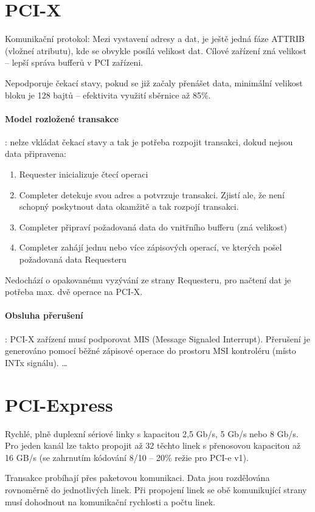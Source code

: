 \documentclass[a4paper, 11pt]{report}
\begin{document}
\section{PCI-X}
Komunikační protokol: Mezi vystavení adresy a dat, je ještě jedná fáze ATTRIB (vložneí atributu), kde se obvykle posílá velikost dat. Cílové zařízení zná velikost -- lepší správa bufferů v PCI zařízeni. 

Nepodporuje čekací stavy, pokud se již začaly přenášet data, minimální velikost bloku je 128 bajtů -- efektivita využití sběrnice až 85\%.

\paragraph{Model rozložené transakce}: nelze vkládat čekací stavy a tak je potřeba rozpojit transakci, dokud nejsou data připravena:
\begin{enumerate}
	\item Requester inicializuje čtecí operaci
	\item Completer detekuje svou adres a potvrzuje transakci. Zjistí ale, že není schopný poskytnout data okamžitě a tak rozpojí transakci.
	\item Completer připraví požadovaná data do vnitřního bufferu (zná velikost)
	\item Completer zahájí jednu nebo více zápisových operací, ve kterých pošel požadovaná data Requesteru
\end{enumerate}
Nedochází o opakovanému vyzývání ze strany Requesteru, pro načtení dat je potřeba max. dvě operace na PCI-X.

\paragraph{Obsluha přerušení}: PCI-X zařízení musí podporovat MIS (Message Signaled Interrupt). Přerušení je generováno pomocí běžné zápisové operace do prostoru MSI kontroléru (místo INTx signálu).
\dots



\section{PCI-Express}
Rychlé, plně duplexní sériové linky s kapacitou 2,5 Gb/s, 5 Gb/s nebo 8 Gb/s. Pro jeden kanál lze takto propojit až 32  těchto linek s přenosovou kapacitou až 16 GB/s (se zahrnutím kódování 8/10 -- 20\% režie pro PCI-e v1).

Transakce probíhají přes paketovou komunikaci. Data jsou rozdělována rovnoměrně do jednotlivých linek. Při propojení linek se obě komunikující strany musí dohodnout na komunikační rychlosti a počtu linek.
\end{document}
